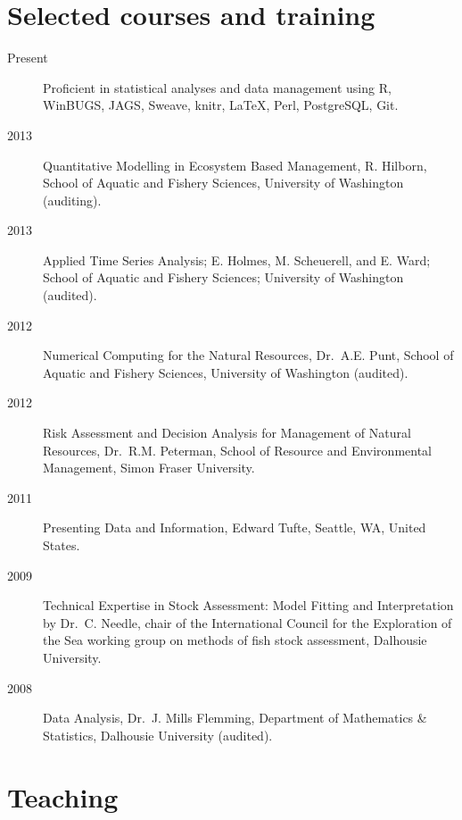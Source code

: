 \section{Selected courses and training}

\begin{description}
\item[Present]
Proficient in statistical analyses and data management using R, WinBUGS,
JAGS, Sweave, knitr, LaTeX, Perl, PostgreSQL, Git.
\item[2013]
Quantitative Modelling in Ecosystem Based Management, R. Hilborn, School
of Aquatic and Fishery Sciences, University of Washington (auditing).
\item[2013]
Applied Time Series Analysis; E. Holmes, M. Scheuerell, and E. Ward;
School of Aquatic and Fishery Sciences; University of Washington
(audited).
\item[2012]
Numerical Computing for the Natural Resources, Dr.\ A.E. Punt, School of
Aquatic and Fishery Sciences, University of Washington (audited).
\item[2012]
Risk Assessment and Decision Analysis for Management of Natural
Resources, Dr.\ R.M. Peterman, School of Resource and Environmental
Management, Simon Fraser University.
\item[2011]
Presenting Data and Information, Edward Tufte, Seattle, WA, United
States.
\item[2009]
Technical Expertise in Stock Assessment: Model Fitting and
Interpretation by Dr.\ C. Needle, chair of the International Council for
the Exploration of the Sea working group on methods of fish stock
assessment, Dalhousie University.
\item[2008]
Data Analysis, Dr.\ J. Mills Flemming, Department of Mathematics \&
Statistics, Dalhousie University (audited).
\end{description}

\section{Teaching}

